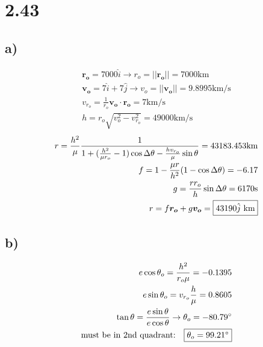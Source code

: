 \documentclass[12 pt]{article}
\begin{document}
\section*{2.43}
\subsection*{a)}
\begin{align*}
    \bm{r_o} =7000\hat{i} \rightarrow r_o=||\bm{r_o}||=7000 \textrm{km} \\
    \bm{v_o}=7\hat{i}+7\hat{j} \rightarrow v_o=||\bm{v_o}||=9.8995 \textrm{km/s} \\
    v_{r_o}=\frac{1}{r_o}\bm{v_o}\cdot \bm{r_o} = 7 \textrm{km/s} \\
    h=r_o\sqrt{v_o^2 - v_{r_o}^2}=49000\textrm{km/s}
\end{align*}
\begin{align*}
    r=\frac{h^2}{\mu}\frac{1}{1+(\frac{h^2}{\mu r_o}-1)\cos{\Delta \theta} - \frac{hv_{r_o}}{\mu}\sin{\theta}}
    =43183.453 \textrm{km} \\
    f = 1-\frac{\mu r}{h^2}(1-\cos{\Delta \theta})=-6.17 \\
    g=\frac{rr_o}{h}\sin{\Delta \theta}=6170\textrm{s} \\
    r=f\bm{r_o}+g\bm{v_o}=\fbox{$43190\hat{j}$ km}
\end{align*}

\subsection*{b)}
\begin{align*}
    e\cos{\theta_o}=\frac{h^2}{r_o \mu}=-0.1395 \\
    e\sin{\theta_o}=v_{r_o}\frac{h}{\mu}=0.8605 \\
    \tan{\theta}=\frac{e\sin{\theta}}{e\cos{\theta}} \rightarrow \theta_o=-80.79^{\circ} \\
    \textrm{must be in 2nd quadrant:} \quad \fbox{$\theta_o=99.21^{\circ}$}
\end{align*}
\end{document}
